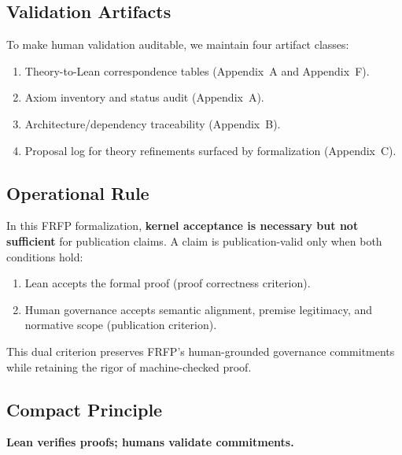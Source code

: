 \subsection{Validation Artifacts}

To make human validation auditable, we maintain four artifact classes:
\begin{enumerate}
  \item Theory-to-Lean correspondence tables (Appendix~A and Appendix~F).
  \item Axiom inventory and status audit (Appendix~A).
  \item Architecture/dependency traceability (Appendix~B).
  \item Proposal log for theory refinements surfaced by formalization (Appendix~C).
\end{enumerate}

\subsection{Operational Rule}

In this FRFP formalization, \textbf{kernel acceptance is necessary but not
sufficient} for publication claims. A claim is publication-valid only when both
conditions hold:
\begin{enumerate}
  \item Lean accepts the formal proof (proof correctness criterion).
  \item Human governance accepts semantic alignment, premise legitimacy, and
        normative scope (publication criterion).
\end{enumerate}

This dual criterion preserves FRFP's human-grounded governance commitments while
retaining the rigor of machine-checked proof.

\subsection{Compact Principle}

\textbf{Lean verifies proofs; humans validate commitments.}
